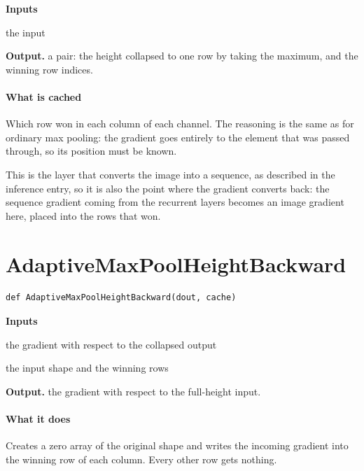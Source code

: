 \noindent\textbf{Inputs}
\begin{description}[leftmargin=2.2em,style=nextline,font=\normalfont\ttfamily]\setlength\itemsep{1pt}
  \item[{x}] \normalfont the input
\end{description}

\noindent\textbf{Output.} a pair: the height collapsed to one row by taking the maximum, and the winning row indices.


\paragraph{What is cached}
Which row won in each column of each channel. The reasoning is the same as for ordinary max pooling: the gradient goes entirely to the element that was passed through, so its position must be known.

This is the layer that converts the image into a sequence, as described in the inference entry, so it is also the point where the gradient converts back: the sequence gradient coming from the recurrent layers becomes an image gradient here, placed into the rows that won.


\section{AdaptiveMaxPoolHeightBackward}
\begin{lstlisting}[style=sig]
def AdaptiveMaxPoolHeightBackward(dout, cache)
\end{lstlisting}

\noindent\textbf{Inputs}
\begin{description}[leftmargin=2.2em,style=nextline,font=\normalfont\ttfamily]\setlength\itemsep{1pt}
  \item[{dout}] \normalfont the gradient with respect to the collapsed output
  \item[{cache}] \normalfont the input shape and the winning rows
\end{description}

\noindent\textbf{Output.} the gradient with respect to the full-height input.


\paragraph{What it does}
Creates a zero array of the original shape and writes the incoming gradient into the winning row of each column. Every other row gets nothing.


